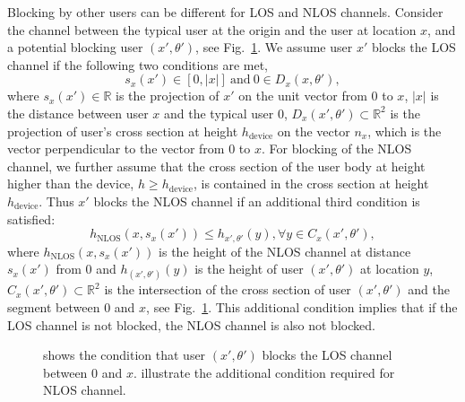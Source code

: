 \documentclass[10pt, conference, letterpaper]{IEEEtran}
\DeclareMathOperator*{\NLOS}{\mathrm{NLOS}}
\begin{document}
Blocking by other users can be different for LOS and NLOS channels. 
Consider the channel between the typical user at the origin and the user at location $x$, and a potential blocking user $(x', \theta')$, see Fig.~\ref{fig:channel:blockage}.
We assume user $x'$ blocks the LOS channel if the following two conditions are met, 
\begin{equation*}
s_x(x')\in [0,|x|]~\textrm{and}~0 \in D_x(x, \theta'),
\end{equation*}
where $s_x(x')\in \mathbb{R}$ is the projection of $x'$ on the unit vector from 0 to $x$, $|x|$ is the distance between user $x$ and the typical user $0$, $D_x(x', \theta')\subset \mathbb{R}^2$ is the projection of user's cross section at height $h_{\mathrm{device}}$ on the vector $n_x$, which is the vector perpendicular to the vector from $0$ to $x$. 
For blocking of the NLOS channel, we further assume that the cross section of the user body at height higher than the device, $h\geq h_{\mathrm{device}}$, is contained in the cross section at height $h_{\mathrm{device}}$.
Thus $x'$ blocks the NLOS channel if an additional third condition is satisfied:
\begin{equation*}
h_{\NLOS}(x, s_x(x')) \leq h_{x', \theta'}(y),\forall y\in C_x(x', \theta'),
\end{equation*}
where $h_{\NLOS}(x, s_x(x'))$ is the height of the NLOS channel at distance $s_x(x')$ from $0$ and $h_{(x', \theta')}(y)$ is the height of user $(x', \theta')$ at location $y$, $C_x(x', \theta')\subset \mathbb{R}^2$ is the intersection of the cross section of user $(x',\theta')$ and the segment between $0$ and $x$, see Fig.~\ref{fig:channel:blockage}. %
This additional condition implies that if the LOS channel is not blocked, the NLOS channel is also not blocked. 


\begin{figure}[hbt]
	\centering
	 \hfill
	\caption[]{ shows the condition that user $(x', \theta')$ blocks the LOS channel between $0$ and $x$.  illustrate the additional condition required for NLOS channel.}
	\label{fig:channel:blockage}
\end{figure}
\end{document}

